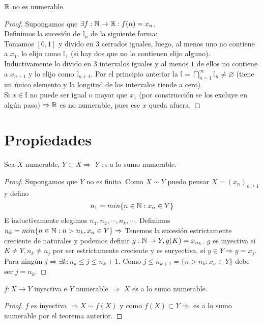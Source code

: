 \begin{theorem}
    \(\mathbb{R}\)  no es numerable.
    \begin{proof}
        Supongamos que \(\exists f:\mathbb{N} \to \mathbb{R} : f(n) = x_n\). \\
        Definimos la sucesión de \(\mathbb{I}_n\) de la siguiente forma: \\
        Tomamos \([0, 1]\) y divido en \(3\) cerrados iguales, luego, al menos uno no contiene a \(x_1\), lo elijo como \(\mathbb{I}_1\) (si  hay dos que no lo contienen elijo alguno). Inductivamente lo divido en \(3\) intervalos iguales y al menos \(1\) de ellos no contiene a \(x_{n+1}\) y lo elijo como \(\mathbb{I}_{n+1}\). Por el principio anterior la \(\mathbb{I} = \bigcap_{n=1}^\infty \mathbb{I}_n \neq \varnothing\) (tiene un único elemento y la longitud de los intervalos tiende a cero). \\
        Si \(x \in \mathbb{I}\) no puede ser igual o mayor que \(x_1\) (por construcción se los excluye en algún paso) \(\Rightarrow \mathbb{R}\) es no numerable, pues ese \(x\) queda afuera.
    \end{proof}
\end{theorem}

\section{Propiedades}

\begin{theorem}
    Sea \(X\) numerable, \(Y \subset X \Rightarrow\) \(Y\) es a lo sumo numerable.
    \begin{proof}
        Supongamos que \(Y\) no es finito. Como \(X \sim Y\) puedo pensar \(X = (x_n)_{n\geq1}\) y defino
        \begin{align*}
            n_1=min\{ n \in \mathbb{N}: x_n \in Y \}
        \end{align*}
        E inductivamente elegimos \(n_1, n_2, \cdots , n_k, \cdots\). Definimos \(n_k = min\{ n \in \mathbb{N} : n > n_k, x_n \in Y \} \Rightarrow\) Tenemos la sucesión estrictamente creciente de naturales y podemos definir \(g: \mathbb{N} \to Y, g(K) = x_{n_k}\). \(g\) es inyectiva si \(K\neq Y, n_k \neq n_j\) por ser estrictamente creciente y es suryectiva, si \(y \in Y \Rightarrow y = x_j\). Para ningún \(j \Rightarrow \exists k :n_k\leq j \leq n_k+1\). Como \(j \leq n_{k+1}=\{ n>n_k:x_n \in Y \}\) debe ser \(j = n_k\).
    \end{proof}
\end{theorem}

\begin{corollary}
    \(f: X \to Y\) inyectiva e \(Y\) numerable \(\Rightarrow\) \(X\) es a lo sumo numerable.
    \begin{proof}
        \(f\) es inyectiva \(\Rightarrow X \sim f(X)\) y como \(f(X) \subset Y \Rightarrow\) es a lo sumo numerable por el teorema anterior.
    \end{proof}
\end{corollary}


